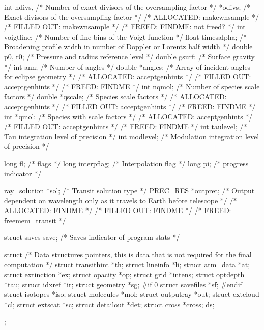 \documentclass[letterpaper,12pt]{article}
\begin{document}
\begin{plain}
{  int ndivs,         /* Number of exact divisors of the oversampling factor */
     *odivs;         /* Exact divisors of the oversampling factor           */
    /* ALLOCATED:	makewnsample					    */
    /* FILLED OUT:	makewnsample					    */
    /* FREED: 		FINDME: not freed?				    */ 
  int voigtfine;     /* Number of fine-bins of the Voigt function           */
  float timesalpha;  /* Broadening profile width in number of Doppler or
                        Lorentz half width                                  */
  double p0, r0;     /* Pressure and radius reference level                 */
  double gsurf;      /* Surface gravity                                     */
  int ann;           /* Number of angles                                    */
  double *angles;    /* Array of incident angles for eclipse geometry       */
    /* ALLOCATED:	acceptgenhints					    */
    /* FILLED OUT:	acceptgenhints					    */
    /* FREED: 		FINDME						    */ 
  int nqmol;         /* Number of species scale factors                     */
  double *qscale;    /* Species scale factors                               */
    /* ALLOCATED:	acceptgenhints					    */
    /* FILLED OUT:	acceptgenhints					    */
    /* FREED: 		FINDME						    */ 
  int *qmol;         /* Species with scale factors                          */
    /* ALLOCATED:	acceptgenhints					    */
    /* FILLED OUT:	acceptgenhints					    */
    /* FREED: 		FINDME						    */ 
  int taulevel;      /* Tau integration level of precision                  */
  int modlevel;      /* Modulation integration level of precision           */

  long fl;           /* flags                                               */
  long interpflag;   /* Interpolation flag                                  */
  long pi;           /* progress indicator                                  */

  ray_solution *sol; /* Transit solution type                               */
  PREC_RES *outpret; /* Output dependent on wavelength only as it travels
                        to Earth before telescope                           */
    /* ALLOCATED:	FINDME						    */
    /* FILLED OUT:	FINDME						    */
    /* FREED: 		freemem_transit					    */ 

  struct saves save; /* Saves indicator of program stats                    */

  struct {           /* Data structures pointers, this is data that is not
                        required for the final computation                  */
    struct transithint *th;
    struct lineinfo    *li;
    struct atm_data    *at;
    struct extinction  *ex;
    struct opacity     *op;
    struct grid        *intens;
    struct optdepth    *tau;
    struct idxref      *ir;
    struct geometry    *sg;
#if 0
    struct savefiles   *sf;
#endif
    struct isotopes    *iso;
    struct molecules   *mol;
    struct outputray   *out;
    struct extcloud    *cl;
    struct extscat     *sc;
    struct detailout   *det;
    struct cross       *cross;
  }ds;
};
\end{plain}
\end{document}
